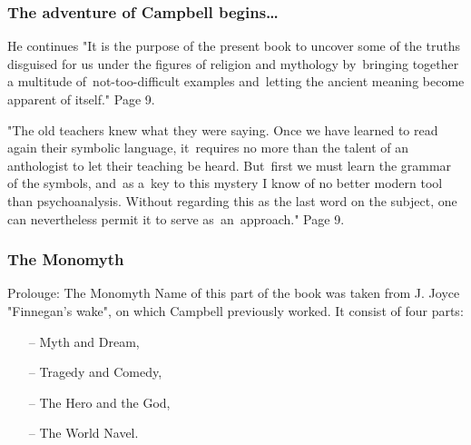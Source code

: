 \documentclass{beamer}  %
\begin{document}
\begin{frame}
  \frametitle{The adventure of Campbell begins\ldots}

  \begin{block}{He continues}
    "It is the purpose of the present book to uncover some of the
    truths disguised for us under the figures of religion and
    mythology by~bringing together a multitude of~not-too-difficult
    examples and~letting the ancient meaning become apparent of
    itself." Page 9.
  \end{block}
  \pause

  \begin{block}{}
    "The old teachers knew what they were saying. Once we have learned
    to read again their symbolic language, it~requires no more than
    the talent of an anthologist to let their teaching be heard.
    But~first we must learn the grammar of the symbols, and~as a~key
    to this mystery I know of no better modern tool than
    psychoanalysis. Without regarding this as the last word on the
    subject, one can nevertheless permit it to serve as~an~approach."
    Page 9.
  \end{block}

\end{frame}



\begin{frame}
  \frametitle{The Monomyth}

  \begin{block}{Prolouge: The Monomyth}
    Name of this part of the book was taken from J. Joyce "Finnegan's
    wake", on which Campbell previously worked. It consist of four
    parts:
    \begin{itemize}
    \item[--] Myth and Dream,
    \item[--] Tragedy and Comedy,
    \item[--] The Hero and the God,
    \item[--] The World Navel.
    \end{itemize}
  \end{block}

\end{frame}
\end{document}
